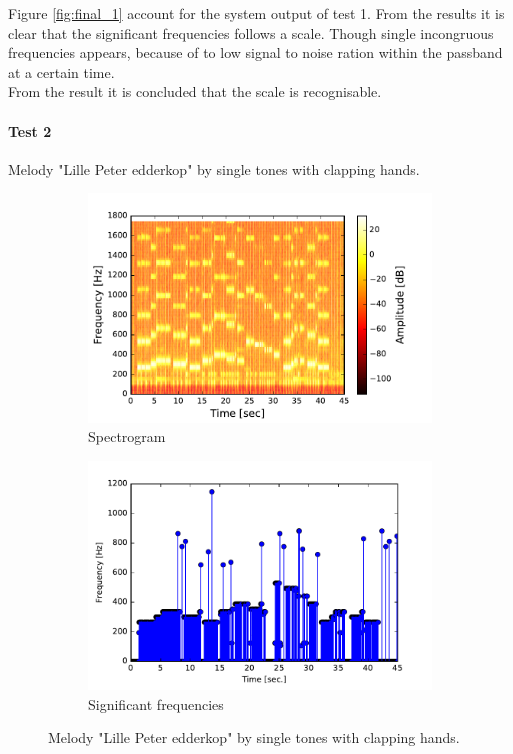 Figure \ref{fig:final_1} account for the system output of test 1. From the results it is clear that the significant frequencies follows a scale. Though single incongruous frequencies appears, because of to low signal to noise ration within the passband at a certain time. \\  
From the result it is concluded that the scale is recognisable. 

\paragraph{Test 2} Melody "Lille Peter edderkop" by single tones with clapping hands.  
\begin{figure}[H]
\centering
\begin{subfigure}{0.49\textwidth}
\centering
\includegraphics[width=\textwidth]{figures/validation/systemtest/final_spec3.pdf}
\caption{Spectrogram}
\label{fig:final_spec2}
\end{subfigure}
\begin{subfigure}{0.49\textwidth}
\centering
\includegraphics[width=\textwidth]{figures/validation/systemtest/final_peak3.pdf}
\caption{Significant frequencies}
\label{fig:final_peak3}
\end{subfigure}
\caption{Melody "Lille Peter edderkop" by single tones with clapping hands.}
\label{fig:final_3}
\end{figure}  

